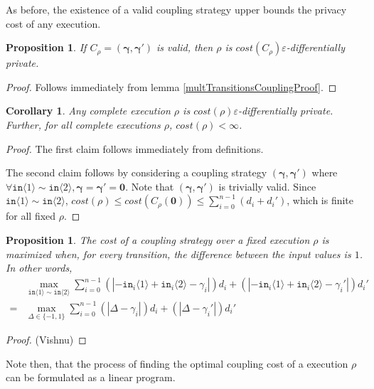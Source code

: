 \documentclass[12pt]{article}
\newcommand{\brangle}[1]{\langle #1 \rangle}
\newtheorem{prop}[thm]{Proposition}
\newtheorem{cor}[thm]{Corollary}
\theoremstyle{definition}
\begin{document}
As before, the existence of a valid coupling strategy upper bounds the privacy cost of any execution. 

\begin{prop}
    If $C_\rho=(\bm{\gamma}, \bm{\gamma}')$ is valid, then $\rho$ is $cost(C_\rho)\varepsilon$-differentially private.
\end{prop}

\begin{proof}
    Follows immediately from lemma \ref{multTransitionsCouplingProof}.
\end{proof}

\begin{cor}
    Any complete execution $\rho$ is $cost(\rho)\varepsilon$-differentially private. Further, for all complete executions $\rho$, $cost(\rho)<\infty$. 
\end{cor}

\begin{proof}
    The first claim follows immediately from definitions. 
    
    The second claim follows by considering a coupling strategy $(\bm{\gamma}, \bm{\gamma}')$ where $\forall \texttt{in}\brangle{1}\sim\texttt{in}\brangle{2}, \bm{\gamma} = \bm{\gamma}' = \bm{0}$. Note that $(\bm{\gamma}, \bm{\gamma}')$ is trivially valid. Since $\texttt{in}\brangle{1}\sim\texttt{in}\brangle{2}$, $cost(\rho)\leq cost(C_\rho(\bm{0}))\leq \sum_{i=0}^{n-1}(d_i+d_i')$, which is finite for all fixed $\rho$. 
\end{proof}


\begin{prop}
    The cost of a coupling strategy over a fixed execution $\rho$ is maximized when, for every transition, the difference between the input values is $1$. In other words,
    \begin{align*}
        &\max_{\texttt{in}\brangle{1}\sim \texttt{in}\brangle{2}} \sum_{i=0}^{n-1}(|-\texttt{in}_i\brangle{1}+\texttt{in}_i\brangle{2}-\gamma_i|)d_i+(|-\texttt{in}_i\brangle{1}+\texttt{in}_i\brangle{2}-\gamma_i'|)d_i' \\
        = &\max_{\Delta\in \{-1, 1\}} \sum_{i=0}^{n-1}(|\Delta-\gamma_i|)d_i+(|\Delta-\gamma_i'|)d_i'
    \end{align*}
\end{prop}
\begin{proof}
    (Vishnu)
\end{proof}

Note then, that the process of finding the optimal coupling cost of a execution $\rho$ can be formulated as a linear program.
 
\end{document}
